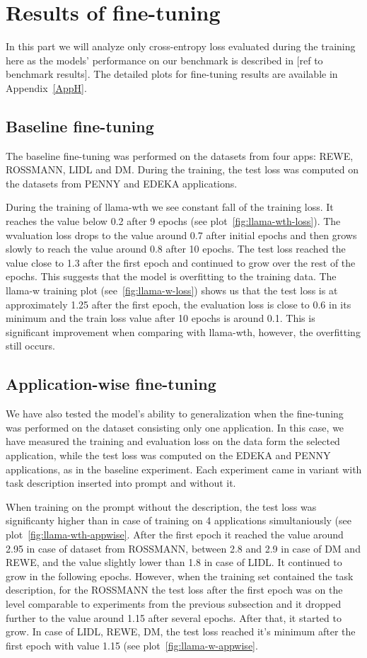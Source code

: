 \documentclass[licencjacka,en]{pracamgr}
\begin{document}
\section{Results of fine-tuning}
In this part we will analyze only cross-entropy loss evaluated during the training here as the models' performance on our benchmark is described in [ref to benchmark results]. The detailed plots for fine-tuning results are available in Appendix~\ref{AppH}.
\subsection{Baseline fine-tuning}
The baseline fine-tuning was performed on the datasets from four apps: REWE, ROSSMANN, LIDL and DM. During the training, the test loss was computed on the datasets from PENNY and EDEKA applications.

During the training of llama-wth we see constant fall of the training loss. It reaches the value below 0.2 after 9 epochs (see plot~\ref{fig:llama-wth-loss}). The wvaluation loss drops to the value around 0.7 after initial epochs and then grows slowly to reach the value around 0.8 after 10 epochs. The test loss reached the value close to 1.3 after the first epoch and continued to grow over the rest of the epochs. This suggests that the model is overfitting to the training data.
The llama-w training plot (see~\ref{fig:llama-w-loss}) shows us that the test loss is at approximately 1.25 after the first epoch, the evaluation loss is close to 0.6 in its minimum and the train loss value after 10 epochs is around 0.1. This is significant improvement when comparing with llama-wth, however, the overfitting still occurs.

\subsection{Application-wise fine-tuning}
We have also tested the model's ability to generalization when the fine-tuning was performed on the dataset consisting only one application. In this case, we have measured the training and evaluation loss on the data form the selected application, while the test loss was computed on the EDEKA and PENNY applications, as in the baseline experiment. Each experiment came in variant with task description inserted into prompt and without it.

When training on the prompt without the description, the test loss was significanty higher than in case of training on 4 applications simultaniously (see plot~\ref{fig:llama-wth-appwise}. After the first epoch it reached the value around 2.95 in case of dataset from ROSSMANN, between 2.8 and 2.9 in case of DM and REWE, and the value slightly lower than 1.8 in case of LIDL. It continued to grow in the following epochs.
However, when the training set contained the task description, for the ROSSMANN the test loss after the first epoch was on the level comparable to experiments from the previous subsection and it dropped further to the value around 1.15 after several epochs. After that, it started to grow. In case of LIDL, REWE, DM, the test loss reached it's minimum after the first epoch with value 1.15 (see plot~\ref{fig:llama-w-appwise}.
\end{document}
